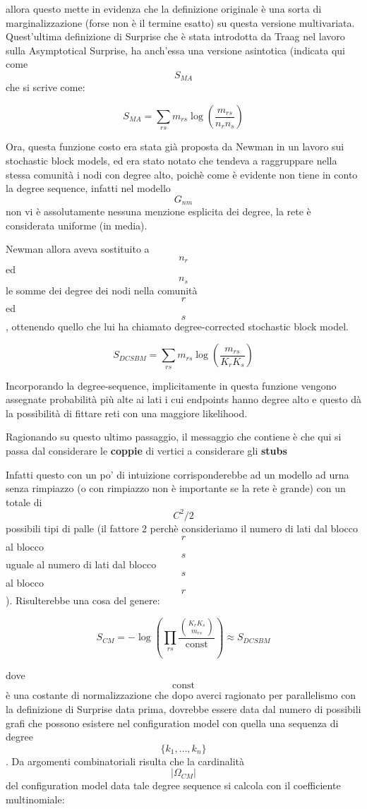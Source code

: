 allora questo mette in evidenza che la definizione originale è una sorta
di marginalizzazione (forse non è il termine esatto) su questa versione
multivariata. Quest'ultima definizione di Surprise che è stata
introdotta da Traag nel lavoro sulla Asymptotical Surprise, ha anch'essa
una versione asintotica (indicata qui come \[S_{MA}\] che si scrive
come:

\[
S_{MA} = \sum_{rs} m_{rs} \log \left( \frac{m_{rs}}{n_r n_s} \right)
\]

Ora, questa funzione costo era stata già proposta da Newman in un lavoro
sui stochastic block models, ed era stato notato che tendeva a
raggruppare nella stessa comunità i nodi con degree alto, poichè come è
evidente non tiene in conto la degree sequence, infatti nel modello
\[G_{nm}\] non vi è assolutamente nessuna menzione esplicita dei degree,
la rete è considerata uniforme (in media).

Newman allora aveva sostituito a \[n_r\] ed \[n_s\] le somme dei degree
dei nodi nella comunità \[r\] ed \[s\], ottenendo quello che lui ha
chiamato degree-corrected stochastic block model.

\[
S_{DCSBM} = \sum_{rs} m_{rs} \log \left( \frac{m_{rs}}{K_r K_s} \right)
\]

Incorporando la degree-sequence, implicitamente in questa funzione
vengono assegnate probabilità più alte ai lati i cui endpoints hanno
degree alto e questo dà la possibilità di fittare reti con una maggiore
likelihood.

Ragionando su questo ultimo passaggio, il messaggio che contiene è che
qui si passa dal considerare le \textbf{coppie} di vertici a considerare
gli \textbf{stubs}

Infatti questo con un po' di intuizione corrisponderebbe ad un modello
ad urna senza rimpiazzo (o con rimpiazzo non è importante se la rete è
grande) con un totale di \[C^2/2\] possibili tipi di palle (il fattore 2
perchè consideriamo il numero di lati dal blocco \[r\] al blocco \[s\]
uguale al numero di lati dal blocco \[s\] al blocco \[r\]). Risulterebbe
una cosa del genere:

\[
S_{CM} = -\log \left( \prod_{rs}  \frac{\binom{K_r K_s}{m_{rs}}}{\textrm{const}} \right) \approx S_{DCSBM}\]

dove \[\textrm{const}\] è una costante di normalizzazione che dopo
averci ragionato per parallelismo con la definizione di Surprise data
prima, dovrebbe essere data dal numero di possibili grafi che possono
esistere nel configuration model con quella una sequenza di degree
\[\{k_1, \ldots ,k_n\}\]. Da argomenti combinatoriali risulta che la
cardinalità \[| \Omega_{CM}|\] del configuration model data tale degree
sequence si calcola con il coefficiente multinomiale:

